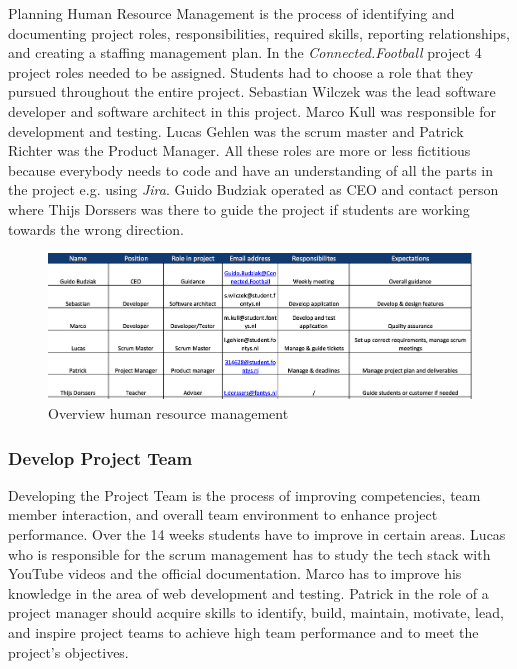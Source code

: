 Planning Human Resource Management is the process of identifying and documenting project roles, responsibilities,
required skills, reporting relationships, and creating a staffing management plan.
\newline
In the \textit{Connected.Football} project 4 project roles needed to be assigned. Students had to choose a role that they pursued throughout the entire project. Sebastian Wilczek was the lead software developer and software architect in this project. Marco Kull was responsible for development and testing. Lucas Gehlen was the scrum master and Patrick Richter was the Product Manager. All these roles are more or less fictitious because everybody needs to code and have an understanding of all the parts in the project e.g. using \textit{Jira}. Guido Budziak operated as CEO and contact person where Thijs Dorssers was there to guide the project if students are working towards the wrong direction.

\begin{figure}[H]
  \includegraphics[width=\linewidth]{images/diagrams/human_resc.png}
  \caption{Overview human resource management}
\end{figure}
\newpage

\subsubsection{Develop Project Team}
\label{sssec:develop_project_team}

Developing the Project Team is the process of improving competencies, team member interaction, and overall team
environment to enhance project performance. Over the 14 weeks students have to improve in certain areas. Lucas who is responsible for the scrum management has to study the tech stack with YouTube videos and the official documentation. Marco has to improve his knowledge in the area of web development and testing. Patrick in the role of a project manager should acquire skills to identify, build, maintain, motivate, lead, and inspire project teams
to achieve high team performance and to meet the project’s objectives. 

